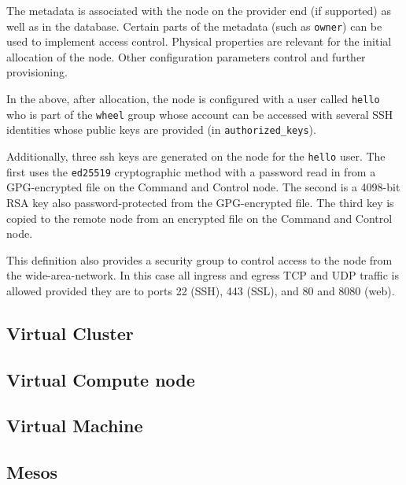 \documentclass[9pt,twocolumn,twoside]{styles/osajnl}
\begin{document}
The metadata is associated with the node on the provider end (if
supported) as well as in the database. Certain parts of the metadata
(such as \verb|owner|) can be used to implement access
control. Physical properties are relevant for the initial allocation
of the node. Other configuration parameters control and further
provisioning.

In the above, after allocation, the node is configured with a user
called \verb|hello| who is part of the \verb|wheel| group whose
account can be accessed with several SSH identities whose public keys
are provided (in \verb|authorized_keys|).

Additionally, three ssh keys are generated on the node for the
\verb|hello| user. The first uses the \verb|ed25519| cryptographic
method with a password read in from a GPG-encrypted file on the
Command and Control node. The second is a 4098-bit RSA key also
password-protected from the GPG-encrypted file. The third key is
copied to the remote node from an encrypted file on the Command and
Control node.

This definition also provides a security group to control access to
the node from the wide-area-network. In this case all ingress and
egress TCP and UDP traffic is allowed provided they are to ports 22
(SSH), 443 (SSL), and 80 and 8080 (web).





\subsection{Virtual Cluster}


\subsection{Virtual Compute node}


\subsection{Virtual Machine}


\subsection{Mesos}
\end{document}
